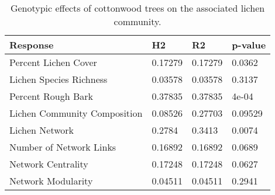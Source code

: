 \begin{table}[ht]
\centering
\begin{tabular}{llll}
  \hline
Response & H2 & R2 & p-value \\ 
  \hline
Percent Lichen Cover & 0.17279 & 0.17279 & 0.0362 \\ 
  Lichen Species Richness & 0.03578 & 0.03578 & 0.3137 \\ 
  Percent Rough Bark & 0.37835 & 0.37835 & 4e-04 \\ 
  Lichen Community Composition & 0.08526 & 0.27703 & 0.09529 \\ 
  Lichen Network & 0.2784 & 0.3413 & 0.0074 \\ 
  Number of Network Links & 0.16892 & 0.16892 & 0.0689 \\ 
  Network Centrality & 0.17248 & 0.17248 & 0.0627 \\ 
  Network Modularity & 0.04511 & 0.04511 & 0.2941 \\ 
   \hline
\end{tabular}
\caption{Genotypic effects of cottonwood trees on the associated lichen community.} 
\label{tab:h2_table}
\end{table}

